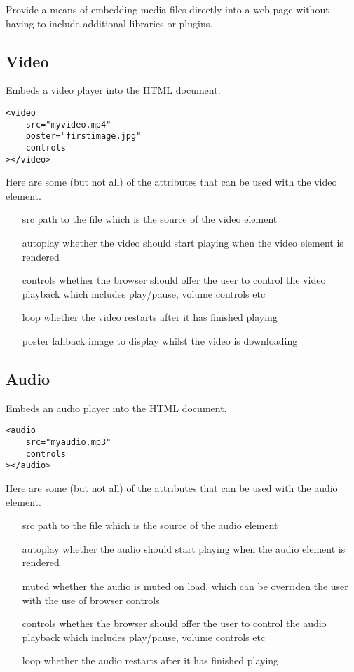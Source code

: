 Provide a means of embedding media files directly into a web page without having to include additional libraries or plugins.

\subsection{Video}

Embeds a video player into the HTML document.

\begin{verbatim}
<video
    src="myvideo.mp4"
    poster="firstimage.jpg"
    controls
></video>
\end{verbatim}

Here are some (but not all) of the attributes that can be used with the video element.

\begin{itemize}
    \item[src] path to the file which is the source of the video element
    \item[autoplay] whether the video should start playing when the video element is rendered
    \item[controls] whether the browser should offer the user to control the video playback which includes play/pause, volume controls etc
    \item[loop] whether the video restarts after it has finished playing
    \item[poster] fallback image to display whilst the video is downloading
\end{itemize}

\subsection{Audio}

Embeds an audio player into the HTML document.

\begin{verbatim}
<audio
    src="myaudio.mp3"
    controls
></audio>
\end{verbatim}

Here are some (but not all) of the attributes that can be used with the audio element.

\begin{itemize}
    \item[src] path to the file which is the source of the audio element
    \item[autoplay] whether the audio should start playing when the audio element is rendered
    \item[muted] whether the audio is muted on load, which can be overriden the user with the use of browser controls
    \item[controls] whether the browser should offer the user to control the audio playback which includes play/pause, volume controls etc
    \item[loop] whether the audio restarts after it has finished playing
\end{itemize}

